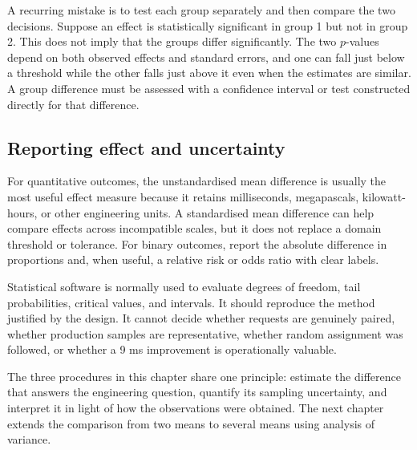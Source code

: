 A recurring mistake is to test each group separately and then compare the two decisions. Suppose an effect is statistically significant in group 1 but not in group 2. This does not imply that the groups differ significantly. The two $p$-values depend on both observed effects and standard errors, and one can fall just below a threshold while the other falls just above it even when the estimates are similar. A group difference must be assessed with a confidence interval or test constructed directly for that difference.

\subsection{Reporting effect and uncertainty}

For quantitative outcomes, the unstandardised mean difference is usually the most useful effect measure because it retains milliseconds, megapascals, kilowatt-hours, or other engineering units. A standardised mean difference can help compare effects across incompatible scales, but it does not replace a domain threshold or tolerance. For binary outcomes, report the absolute difference in proportions and, when useful, a relative risk or odds ratio with clear labels.

Statistical software is normally used to evaluate degrees of freedom, tail probabilities, critical values, and intervals. It should reproduce the method justified by the design. It cannot decide whether requests are genuinely paired, whether production samples are representative, whether random assignment was followed, or whether a 9 ms improvement is operationally valuable.

The three procedures in this chapter share one principle: estimate the difference that answers the engineering question, quantify its sampling uncertainty, and interpret it in light of how the observations were obtained. The next chapter extends the comparison from two means to several means using analysis of variance.
